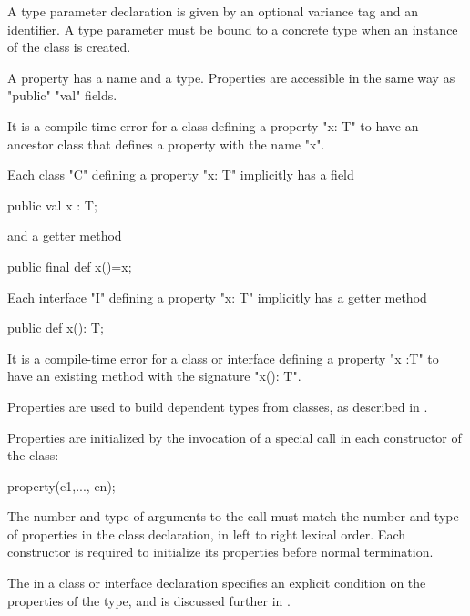 A type parameter declaration is given by an optional variance tag and an identifier.
A type parameter must be bound to a concrete type when an instance of the class is created.


A property has a name and a type.   Properties
are accessible in the same way as \xcd"public" \xcd"val"
fields.

\begin{staticrule*}
It is a compile-time error for a class
defining a property \xcd"x: T" to have an ancestor class that defines
a property with the name \xcd"x".  
\end{staticrule*}

Each class \xcd"C" defining a property \xcd"x: T" implicitly has a field

\begin{xten}
public val x : T;
\end{xten} 

\noindent and a getter method

\begin{xten}
public final def x()=x;
\end{xten}

\noindent Each interface \xcd"I" defining a property \xcd"x: T"
implicitly has a getter method

\begin{xten}
public def x(): T;
\end{xten}

\begin{staticrule*}
It is a compile-time error for a class or
interface defining a property \xcd"x :T" to have an existing method with
the signature \xcd"x(): T".
\end{staticrule*}

Properties are used to build dependent types from classes, as
described in .

Properties are initialized by the invocation of a special  call in each constructor
of the class:
\begin{xten}
property(e1,..., en);
\end{xten}
The number and type of arguments to the  call must match the number
and type of properties in the class declaration, in left to right lexical order. Each constructor is required to initialize its properties before normal termination.
\label{PropertyCall}

\label{ClassGuard}

The  in a class or interface declaration specifies an
explicit condition on the properties of the type, and is discussed further
in .


